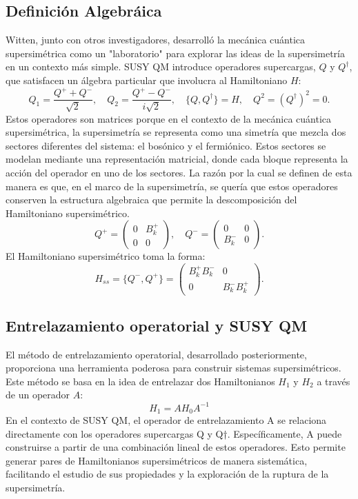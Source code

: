\documentclass[%
 aip,
 jmp,%
 amsmath,amssymb,
 reprint,
]{revtex4-2}
\begin{document}
\subsection{Definición Algebráica}
Witten, junto con otros investigadores, desarrolló la mecánica cuántica supersimétrica como un "laboratorio" para explorar las ideas de la supersimetría en un contexto más simple. SUSY QM introduce operadores supercargas, $Q$ y $Q^{\dagger}$, que satisfacen un álgebra particular que involucra al Hamiltoniano $H$:
\begin{equation}
Q_1 = \frac{Q^+ + Q^-}{\sqrt{2}}, \quad
Q_2 = \frac{Q^+ - Q^-}{i\sqrt{2}}, \quad
\{Q, Q^{\dagger}\} = H, \quad Q^2 = (Q^{\dagger})^2 = 0.
\end{equation}
Estos operadores son matrices porque en el contexto de la mecánica cuántica supersimétrica, la supersimetría se representa como una simetría que mezcla dos sectores diferentes del sistema: el bosónico y el fermiónico. Estos sectores se modelan mediante una representación matricial, donde cada bloque representa la acción del operador en uno de los sectores.
La razón por la cual se definen de esta manera es que, en el marco de la supersimetría, se quería que estos operadores conserven la estructura algebraica que permite la descomposición del Hamiltoniano supersimétrico.
\begin{equation}
Q^+ = \begin{pmatrix} 0 & B_k^+ \\ 0 & 0 \end{pmatrix}, \quad Q^- = \begin{pmatrix} 0 & 0 \\ B_k^- & 0 \end{pmatrix}.
\end{equation}
El Hamiltoniano supersimétrico toma la forma:
\begin{equation}
H_{ss} = \{Q^-, Q^+\} = \begin{pmatrix} B_k^+ B_k^- & 0 \\ 0 & B_k^- B_k^+ \end{pmatrix}.
\end{equation}
\subsection{Entrelazamiento operatorial y SUSY QM}
El método de entrelazamiento operatorial, desarrollado posteriormente, proporciona una herramienta poderosa para construir sistemas supersimétricos. Este método se basa en la idea de entrelazar dos Hamiltonianos \( H_1 \) y \( H_2 \) a través de un operador \( A \):
\begin{equation}
H_1 = A H_0 A^{-1}
\end{equation}
En el contexto de SUSY QM, el operador de entrelazamiento A se relaciona directamente con los operadores supercargas Q y Q†. Específicamente, A puede construirse a partir de una combinación lineal de estos operadores. Esto permite generar pares de Hamiltonianos supersimétricos de manera sistemática, facilitando el estudio de sus propiedades y la exploración de la ruptura de la supersimetría.
\end{document}
